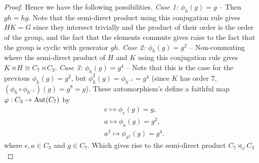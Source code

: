 \begin{proof}
  Hence we have the following possibilities. 
  \emph{Case 1: $\phi_h(g)=g$} -- Then $gh=hg$. Note that the semi-direct product using
  this conjugation rule gives $HK=G$ since they intersect trivially and the product of
  their order is the order of the group, and the fact that the elements commute gives
  raise to the fact that the group is cyclic with generator $gh$.
  \emph{Case 2: $\phi_h(g)=g^2$} -- Non-commuting where the semi-direct product of $H$ and
  $K$ using this conjugation rule gives $K\rtimes H\cong C_7\rtimes C_3$.
  \emph{Case 3: $\phi_h(g)=g^4$} -- Note that this is the case for the previous
  $\phi_h(g)=g^2$, but $\phi_h^2(g)=\phi_{h^{-1}}=g^4$ (since $K$ has order 7, $(\phi_h \circ \phi_{h^{-1}})(g) = g^8 = g$). These automorphism's define a faithful map $\varphi : C_3 \rightarrow \operatorname{Aut}(C_7)$ by 
  \begin{align*}
      & e \mapsto \phi_{e}(g) = g, \\
      & a \mapsto \phi_{a}(g) = g^2, \\
      & a^2 \mapsto \phi_{a^2}(g) = g^4.
  \end{align*}
  where $e,a \in C_3$ and $g \in C_7$. Which gives rise to the semi-direct product $C_7\rtimes_{\varphi} C_3$
\end{proof}
